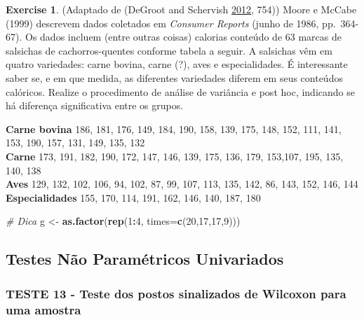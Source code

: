 \documentclass[
]{book}
\newenvironment{Shaded}{\begin{snugshade}}{\end{snugshade}}
\newcommand{\CommentTok}[1]{\textcolor[rgb]{0.56,0.35,0.01}{\textit{#1}}}
\newcommand{\DataTypeTok}[1]{\textcolor[rgb]{0.13,0.29,0.53}{#1}}
\newcommand{\DecValTok}[1]{\textcolor[rgb]{0.00,0.00,0.81}{#1}}
\newcommand{\KeywordTok}[1]{\textcolor[rgb]{0.13,0.29,0.53}{\textbf{#1}}}
\newcommand{\NormalTok}[1]{#1}
\newcommand{\OperatorTok}[1]{\textcolor[rgb]{0.81,0.36,0.00}{\textbf{#1}}}
\newcommand{\StringTok}[1]{\textcolor[rgb]{0.31,0.60,0.02}{#1}}
\theoremstyle{definition}
\theoremstyle{definition}
\theoremstyle{definition}
\newtheorem{exercise}{Exercise}[chapter]
\theoremstyle{remark}
\begin{document}
\begin{exercise}
\protect\hypertarget{exr:anova-hot-dog}{}{\label{exr:anova-hot-dog} }(Adaptado de (DeGroot and Schervish \protect\hyperlink{ref-degroot2012probability}{2012}, 754)) Moore e McCabe (1999) descrevem dados coletados em \emph{Consumer Reports} (junho de 1986, pp.~364-67). Os dados incluem (entre outras coisas) calorias conteúdo de 63 marcas de salsichas de cachorros-quentes conforme tabela a seguir. A salsichas vêm em quatro variedades: carne bovina, carne (?), aves e especialidades. É interessante saber se, e em que medida, as diferentes variedades diferem em seus conteúdos calóricos. Realize o procedimento de análise de variância e post hoc, indicando se há diferença significativa entre os grupos.

\textbf{Carne bovina} 186, 181, 176, 149, 184, 190, 158, 139, 175, 148, 152, 111, 141, 153, 190, 157, 131, 149, 135, 132\\
\textbf{Carne} 173, 191, 182, 190, 172, 147, 146, 139, 175, 136, 179, 153,107, 195, 135, 140, 138\\
\textbf{Aves} 129, 132, 102, 106, 94, 102, 87, 99, 107, 113, 135, 142, 86, 143, 152, 146, 144\\
\textbf{Especialidades} 155, 170, 114, 191, 162, 146, 140, 187, 180
\end{exercise}

\begin{Shaded}
\begin{Highlighting}[]
\CommentTok{\# Dica}
\NormalTok{g \textless{}{-}}\StringTok{ }\KeywordTok{as.factor}\NormalTok{(}\KeywordTok{rep}\NormalTok{(}\DecValTok{1}\OperatorTok{:}\DecValTok{4}\NormalTok{, }\DataTypeTok{times=}\KeywordTok{c}\NormalTok{(}\DecValTok{20}\NormalTok{,}\DecValTok{17}\NormalTok{,}\DecValTok{17}\NormalTok{,}\DecValTok{9}\NormalTok{)))}
\end{Highlighting}
\end{Shaded}

\hypertarget{testes-nuxe3o-paramuxe9tricos-univariados}{%
\subsection{Testes Não Paramétricos Univariados}\label{testes-nuxe3o-paramuxe9tricos-univariados}}

\hypertarget{teste-13---teste-dos-postos-sinalizados-de-wilcoxon-para-uma-amostra}{%
\subsubsection*{TESTE 13 - Teste dos postos sinalizados de Wilcoxon para uma amostra}\label{teste-13---teste-dos-postos-sinalizados-de-wilcoxon-para-uma-amostra}}
\end{document}
